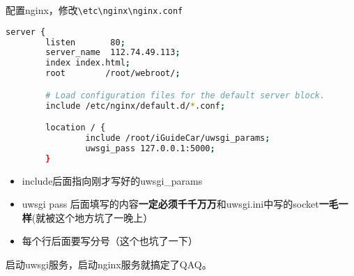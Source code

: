 \documentclass[cyan]{elegantnote}
\begin{document}
配置nginx，修改\verb!\etc\nginx\nginx.conf!
\begin{lstlisting}[language=bash,caption=和uwsgi建立了关系的nginx配置]
server {
        listen       80;
        server_name  112.74.49.113;
        index index.html;
        root        /root/webroot/;

        # Load configuration files for the default server block.
        include /etc/nginx/default.d/*.conf;

        location / {
                include /root/iGuideCar/uwsgi_params;
                uwsgi_pass 127.0.0.1:5000;
        }
\end{lstlisting}
\begin{itemize}
\item include后面指向刚才写好的uwsgi\_params
\item uwsgi pass 后面填写的内容\textbf{一定必须千千万万}和uwsgi.ini中写的socket\textbf{一毛一样}(就被这个地方坑了一晚上）
\item 每个行后面要写分号（这个也坑了一下）
\end{itemize}

启动uwsgi服务，启动nginx服务就搞定了QAQ。
\end{document}
